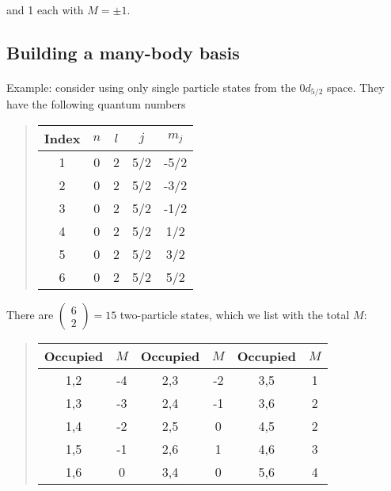 \documentclass[%
twoside,                 %
final,                   %
10pt]{article}
\begin{document}
\noindent
and 1 each with $M = \pm 1$.








\subsection*{Building a many-body basis}

\paragraph{}

Example: consider using only single particle states from the $0d_{5/2}$ space. 
They have the following quantum numbers


\begin{quote}
\begin{tabular}{ccccc}
\hline
\multicolumn{1}{c}{ Index } & \multicolumn{1}{c}{ $n$ } & \multicolumn{1}{c}{ $l$ } & \multicolumn{1}{c}{ $j$ } & \multicolumn{1}{c}{ $m_j$ } \\
\hline
1     & 0   & 2   & 5/2 & -5/2  \\
2     & 0   & 2   & 5/2 & -3/2  \\
3     & 0   & 2   & 5/2 & -1/2  \\
4     & 0   & 2   & 5/2 & 1/2   \\
5     & 0   & 2   & 5/2 & 3/2   \\
6     & 0   & 2   & 5/2 & 5/2   \\
\hline
\end{tabular}
\end{quote}

\noindent
There are $\left ( \begin{array}{c} 6 \\ 2 \end{array} \right) = 15$ two-particle states, 
which we list with the total $M$:


\begin{quote}
\begin{tabular}{cccccc}
\hline
\multicolumn{1}{c}{ Occupied } & \multicolumn{1}{c}{ $M$ } & \multicolumn{1}{c}{ Occupied } & \multicolumn{1}{c}{ $M$ } & \multicolumn{1}{c}{ Occupied } & \multicolumn{1}{c}{ $M$ } \\
\hline
1,2      & -4  & 2,3      & -2  & 3,5      & 1   \\
1,3      & -3  & 2,4      & -1  & 3,6      & 2   \\
1,4      & -2  & 2,5      & 0   & 4,5      & 2   \\
1,5      & -1  & 2,6      & 1   & 4,6      & 3   \\
1,6      & 0   & 3,4      & 0   & 5,6      & 4   \\
\hline
\end{tabular}
\end{quote}
\end{document}
